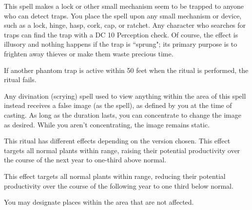 \begin{spelleffect}
This spell makes a lock or other small mechanism seem to be trapped to anyone who can detect traps. You place the spell upon any small mechanism or device, such as a lock, hinge, hasp, cork, cap, or ratchet. Any character who searches for traps can find the trap with a DC 10 Perception check. Of course, the effect is illusory and nothing happens if the trap is ``sprung"; its primary purpose is to frighten away thieves or make them waste precious time.
\par If another phantom trap is active within 50 feet when the ritual is performed, the ritual fails.
\end{spelleffect}

\begin{spelleffect}
Any divination (scrying) spell used to view anything within the area of this spell instead receives a false image (as the  spell), as defined by you at the time of casting. As long as the duration lasts, you can concentrate to change the image as desired. While you aren't concentrating, the image remains static.
\end{spelleffect}

\begin{spelleffect}
This ritual has different effects depending on the version chosen.
 This effect targets all normal plants within range, raising their potential productivity over the course of the next year to one-third above normal.
\par {} This effect targets all normal plants within range, reducing their potential productivity over the course of the following year to one third below normal.
\end{spelleffect}
\begin{spellnotes}
You may designate places within the area that are not affected.
\end{spellnotes}

